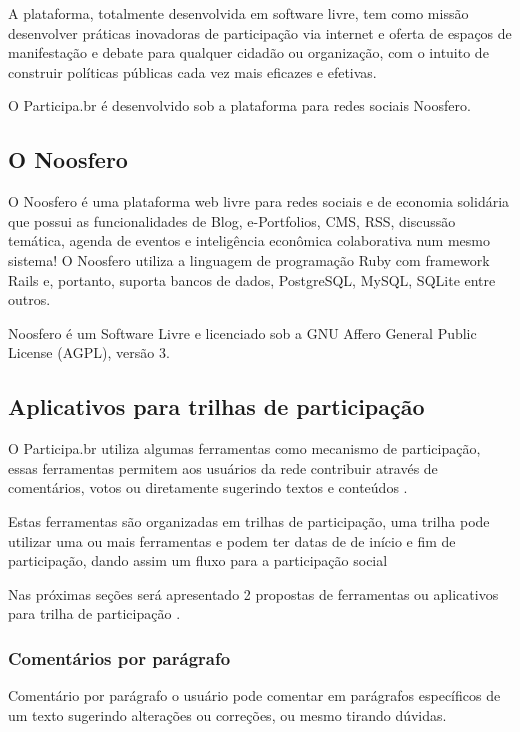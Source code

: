 \documentclass[12pt]{article}
\begin{document}
A plataforma, totalmente desenvolvida em software livre, tem como missão
desenvolver práticas inovadoras de participação via internet e oferta de
espaços de manifestação e debate para qualquer cidadão ou organização, com o
intuito de construir políticas públicas cada vez mais eficazes e efetivas.

O Participa.br é desenvolvido sob a plataforma para redes sociais Noosfero.

\subsection{O Noosfero}

O Noosfero é uma plataforma web livre para redes sociais e de economia
solidária que possui as funcionalidades de Blog, e-Portfolios, CMS, RSS,
discussão temática, agenda de eventos e inteligência econômica colaborativa
num mesmo sistema! O Noosfero utiliza a linguagem de programação Ruby com
framework Rails e, portanto, suporta bancos de dados, PostgreSQL, MySQL,
SQLite entre outros.

Noosfero é um Software Livre e licenciado sob a GNU Affero General Public
License (AGPL), versão 3\cite{wikipediaSingleSignOn}.

\subsection{Aplicativos para trilhas de participação}
 
O Participa.br utiliza algumas ferramentas como mecanismo de participação,
essas ferramentas permitem aos usuários da rede contribuir através de
comentários, votos ou diretamente sugerindo textos e conteúdos .

Estas ferramentas são organizadas em trilhas de participação, uma trilha
pode utilizar uma ou mais ferramentas e podem ter datas de de início e fim de
participação, dando assim um fluxo para a participação social 

Nas próximas seções será apresentado 2 propostas de ferramentas ou aplicativos
para trilha de participação .

\subsubsection{Comentários por parágrafo}

Comentário por parágrafo o usuário pode comentar em parágrafos específicos de
um texto sugerindo alterações ou correções, ou mesmo tirando dúvidas.
\end{document}
